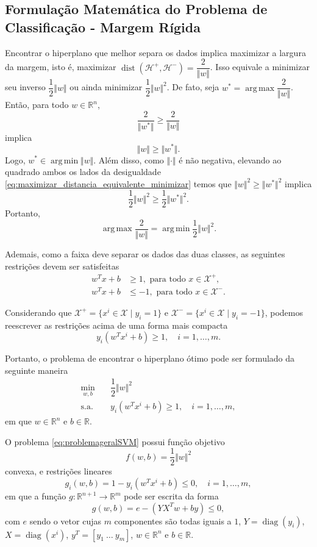 \documentclass[12pt,a4paper]{scrartcl}
\DeclareMathOperator*{\argmax}{arg\, max}
\DeclareMathOperator*{\argmin}{arg\, min}
\DeclareMathOperator{\diag}{diag}
\DeclareMathOperator{\dist}{dist}
\def\Xset{\mathcal{X}}
\def\Hset{\mathcal{H}}
\def\RR{\mathds{R}}
\theoremstyle{definition}%
\begin{document}
\subsection{Formulação Matemática do Problema de Classificação - Margem Rígida}

Encontrar o hiperplano que melhor separa os dados implica maximizar a largura da margem, isto é, maximizar $\dist(\Hset^{+} , \Hset^{-}) =\dfrac{2}{\Vert w\Vert }$. Isso equivale a minimizar seu inverso $\dfrac{1}{2}\Vert w\Vert $ ou ainda minimizar $\dfrac{1}{2}\Vert w\Vert^{2}$. De fato, seja $w^{*}=\argmax\dfrac{2}{\Vert w\Vert}$. Então, para todo $w\in \RR^n$,
\[ 
\dfrac{2}{\Vert w^{*}\Vert} \geq \dfrac{2}{\Vert w\Vert} 
\]
implica
\[ \label{eq:maximizar_distancia_equivalente_minimizar} 
\Vert w\Vert \geq \Vert w^{*}\Vert. 
\]
Logo, $w^{*} \in \argmin\Vert w\Vert$. Além disso, como $\Vert \cdot \Vert$ é não negativa, elevando ao quadrado ambos os lados da desigualdade \eqref{eq:maximizar_distancia_equivalente_minimizar} temos que  $\Vert w\Vert^{2} \geq \Vert w^{*}\Vert^{2}$ implica
\[ 
\dfrac{1}{2}\Vert w\Vert^{2} \geq \dfrac{1}{2}\Vert w^{*}\Vert^{2}. 
\]
Portanto, 
\[ \argmax\dfrac{2}{\Vert w\Vert} = \argmin\dfrac{1}{2}\Vert w\Vert^2. \]

Ademais, como a faixa deve separar os dados das duas classes, as seguintes restrições devem ser satisfeitas
\begin{align}
w^{T}x+b &\geq 1 , \text{ para  todo } x\in \Xset^{+}, \\
w^{T}x+b &\leq -1 , \text{ para  todo } x\in \Xset^{-}.
\end{align}

Considerando que $\Xset^{+}=\{x^i \in \Xset\mid y_i=1\}$ e $\Xset^{-}=\{x^i \in \Xset \mid y_i=-1\}$, podemos reescrever as restrições acima de uma forma mais compacta 
\[ y_{i}(w^{T}x^{i}+b)\geq 1, \quad i=1, \ldots ,m. \]

Portanto, o problema de encontrar o hiperplano ótimo pode ser formulado da seguinte maneira
\[ \label{eq:problemageralSVM}
\begin{aligned}
\min_{w,b} & \quad \dfrac{1}{2} \Vert w\Vert^{2} \\
\text{s.a.} &  \quad y_i(w^{T}x^{i}+b) \geq 1, \quad i=1, \ldots , m, \end{aligned}
 \]
em que $w\in \RR^{n}$ e $b\in \RR$. 

O problema \eqref{eq:problemageralSVM} possui função objetivo 
\[ f(w,b)=\dfrac{1}{2}\Vert w\Vert^{2} \]
convexa, e restrições lineares
\[ g_i(w,b)=1-y_i(w^{T}x^{i}+b) \leq 0, \quad i=1, \ldots, m, \]
em que a função $g:\RR^{n+1} \rightarrow \RR^{m}$ pode ser escrita da forma 
\[ g(w,b)= e - (YX^{T}w+by) \leq 0, \]
com $e$ sendo o vetor cujas $m$ componentes são todas iguais a $1$, $Y=\diag(y_{i})$, $X=\diag(x^{i})$, $y^{T}=[y_{1} \ \ldots \ y_{m}]$, $w\in \RR^n$ e $b\in \RR$.
\end{document}
